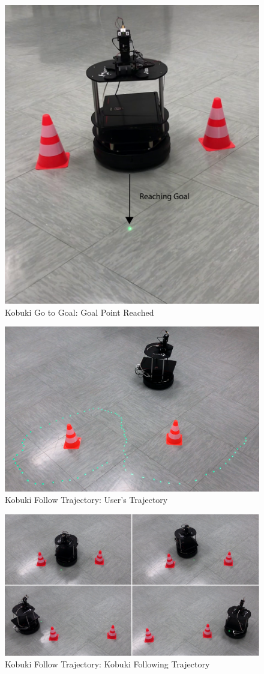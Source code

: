 \begin{figure}
	\centering
	\includegraphics[width=.7\textwidth]{img/kgtgGoal.png}%
	\caption{Kobuki Go to Goal: Goal Point Reached}
	\label{fig:kgtgGoal}
\end{figure}
\begin{figure}
	\centering
	\includegraphics[width=.7\textwidth]{img/kftTrajectory.png}%
	\caption{Kobuki Follow Trajectory: User's Trajectory}
	\label{fig:kftTrajectory}
\end{figure}
\begin{figure}
	\centering
	\includegraphics[width=\textwidth]{img/kftFollowing.png}%
	\caption{Kobuki Follow Trajectory: Kobuki Following Trajectory}
	\label{fig:kftFollowing}
\end{figure}